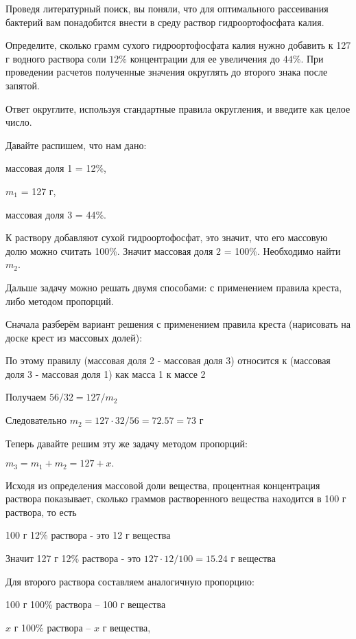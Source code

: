 
Проведя литературный поиск, вы поняли, что для оптимального рассеивания бактерий вам понадобится 
внести в среду раствор гидроортофосфата калия.

Определите, сколько грамм сухого гидроортофосфата калия нужно добавить к 127 г водного раствора соли $12\%$ 
концентрации для ее увеличения до $44\%$. При проведении расчетов полученные значения округлять до 
второго знака после запятой.

Ответ округлите, используя стандартные правила округления, и введите как целое число.

\solutionSection

Давайте распишем, что нам дано:

массовая доля 1 = 12\%,

$m_1$ = 127 г,

массовая доля 3 = 44\%.

К раствору добавляют сухой гидроортофосфат, это значит, что его массовую долю можно считать 100\%. Значит массовая доля 2 = 100\%. Необходимо найти $m_2$. 

Дальше задачу можно решать двумя способами: с применением правила креста, либо методом пропорций.

Сначала разберём вариант решения с применением правила креста (нарисовать на доске крест из массовых долей):


По этому правилу 
(массовая доля 2 - массовая доля 3) относится к (массовая доля 3 - массовая доля 1) как масса 1 к массе 2

Получаем $56/32 = 127/m_2$

Следовательно $m_2 = 127 \cdot 32/56 = 72.57=73$ г

Теперь давайте решим эту же задачу методом пропорций:

$m_3 = m_1 + m_2 = 127 + x.$

Исходя из определения массовой доли вещества, процентная концентрация раствора показывает, сколько граммов растворенного вещества находится 
в 100 г раствора, то есть 

100 г 12\% раствора - это 12 г вещества

Значит 127 г 12\% раствора - это $127 \cdot 12/100 = 15.24$ г вещества

Для второго раствора составляем аналогичную пропорцию:

100 г 100\% раствора – 100 г вещества

$x$ г 100\% раствора – $x$ г вещества,

